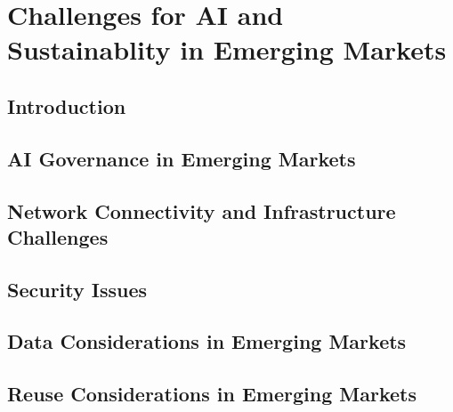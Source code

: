 \chapter{Challenges for AI and Sustainablity in Emerging Markets}
\label{chap:intro:final}

\lipsum[1-2]
\section{Introduction}\label{sec:final:ai:intro}
\lipsum[2-4]

\section{AI Governance in Emerging Markets}
\lipsum[2-4]

\section{Network Connectivity and Infrastructure Challenges}
\lipsum[2-4]

\section{Security Issues }
\lipsum[2-4]

\section{Data Considerations in Emerging Markets}
\lipsum[2-4]

\section{Reuse Considerations in Emerging Markets}
\lipsum[2-4]
